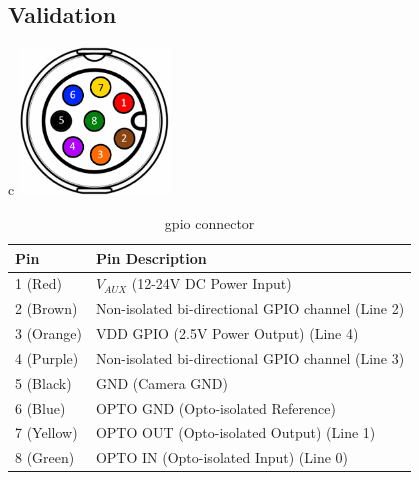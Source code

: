 \subsection{Validation}
\begin{table}[H]
    \centering
    \begin{tabular}{c}
        \includegraphics[width=0.3\textwidth]{figures/m8-pin-layout.png}
        \\
        \small
        \begin{tabular}{ |l|l| }
            \hline
            \textbf{Pin} & \textbf{Pin Description}                          \\
            \hline
            1 (Red)      & $V_{AUX}$ (12-24V DC Power Input)                 \\
            2 (Brown)    & Non-isolated bi-directional GPIO channel (Line 2) \\
            3 (Orange)   & VDD GPIO (2.5V Power Output) (Line 4)             \\
            4 (Purple)   & Non-isolated bi-directional GPIO channel (Line 3) \\
            5 (Black)    & GND (Camera GND)                                  \\
            6 (Blue)     & OPTO GND (Opto-isolated Reference)                \\
            7 (Yellow)   & OPTO OUT (Opto-isolated Output) (Line 1)          \\
            8 (Green)    & OPTO IN (Opto-isolated Input) (Line 0)            \\
            \hline
        \end{tabular}
    \end{tabular}
    \caption{\cam \gls{gpio} connector \cite{lucidvisionlabsTritonMPPolarized2020}}

\end{table}


